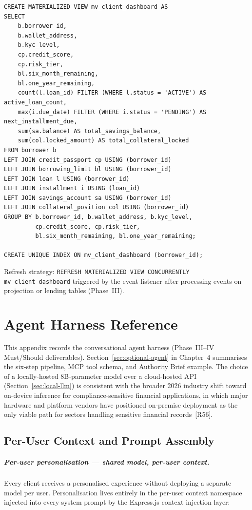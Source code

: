 \documentclass[12pt,a4paper]{report}
\begin{document}
\begin{verbatim}
CREATE MATERIALIZED VIEW mv_client_dashboard AS
SELECT
    b.borrower_id,
    b.wallet_address,
    b.kyc_level,
    cp.credit_score,
    cp.risk_tier,
    bl.six_month_remaining,
    bl.one_year_remaining,
    count(l.loan_id) FILTER (WHERE l.status = 'ACTIVE') AS active_loan_count,
    max(i.due_date) FILTER (WHERE i.status = 'PENDING') AS next_installment_due,
    sum(sa.balance) AS total_savings_balance,
    sum(col.locked_amount) AS total_collateral_locked
FROM borrower b
LEFT JOIN credit_passport cp USING (borrower_id)
LEFT JOIN borrowing_limit bl USING (borrower_id)
LEFT JOIN loan l USING (borrower_id)
LEFT JOIN installment i USING (loan_id)
LEFT JOIN savings_account sa USING (borrower_id)
LEFT JOIN collateral_position col USING (borrower_id)
GROUP BY b.borrower_id, b.wallet_address, b.kyc_level,
         cp.credit_score, cp.risk_tier,
         bl.six_month_remaining, bl.one_year_remaining;

CREATE UNIQUE INDEX ON mv_client_dashboard (borrower_id);
\end{verbatim}

\noindent Refresh strategy: \texttt{REFRESH MATERIALIZED VIEW CONCURRENTLY mv\_client\_dashboard} triggered by the event listener after processing events on projection or lending tables (Phase~III).

\chapter{Agent Harness Reference}
\label{app:agent-harness}

This appendix records the conversational agent harness (Phase~III--IV Must/Should deliverables). Section~\ref{sec:optional-agent} in Chapter~4 summarises the six-step pipeline, MCP tool schema, and Authority Brief example.
The choice of a locally-hosted 8B-parameter model over a cloud-hosted
API (Section~\ref{sec:local-llm}) is consistent with the broader 2026
industry shift toward on-device inference for compliance-sensitive
financial applications, in which major hardware and platform vendors
have positioned on-premise deployment as the only viable path for
sectors handling sensitive financial records~[R56].

\section{Per-User Context and Prompt Assembly}

\paragraph{Per-user personalisation --- shared model, per-user context.}
Every client receives a personalised experience without deploying a separate model per user. Personalisation lives entirely in the per-user context namespace injected into every system prompt by the Express.js context injection layer:
\end{document}
